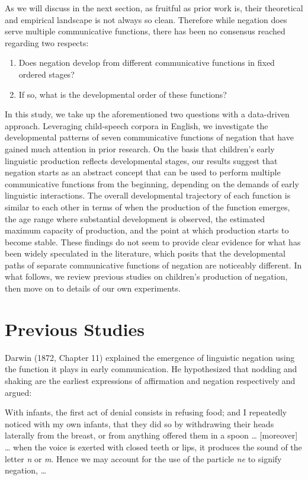 \documentclass[
  english,
  man,floatsintext]{apa6}
\begin{document}
As we will discuss in the next section, as fruitful as prior work is, their theoretical and empirical landscape is not always so clean. Therefore while negation does serve multiple communicative functions, there has been no consensus reached regarding two respects:

\begin{enumerate}
\def\labelenumi{(\arabic{enumi})}
\item
  Does negation develop from different communicative functions in fixed ordered stages?
\item
  If so, what is the developmental order of these functions?
\end{enumerate}

In this study, we take up the aforementioned two questions with a data-driven approach. Leveraging child-speech corpora in English, we investigate the developmental patterns of seven communicative functions of negation that have gained much attention in prior research. On the basis that children's early linguistic production reflects developmental stages, our results suggest that negation starts as an abstract concept that can be used to perform multiple communicative functions from the beginning, depending on the demands of early linguistic interactions. The overall developmental trajectory of each function is similar to each other in terms of when the production of the function emerges, the age range where substantial development is observed, the estimated maximum capacity of production, and the point at which production starts to become stable. These findings do not seem to provide clear evidence for what has been widely speculated in the literature, which posits that the developmental paths of separate communicative functions of negation are noticeably different. In what follows, we review previous studies on children's production of negation, then move on to details of our own experiments.

\hypertarget{previous-studies}{%
\section{Previous Studies}\label{previous-studies}}

Darwin (1872, Chapter 11) explained the emergence of linguistic negation using the function it plays in early communication. He hypothesized that nodding and shaking are the earliest expressions of affirmation and negation respectively and argued:

With infants, the first act of denial consists in refusing food; and I repeatedly noticed with my own infants, that they did so by withdrawing their heads laterally from the breast, or from anything offered them in a spoon \ldots{} {[}moreover{]} \ldots{} when the voice is exerted with closed teeth or lips, it produces the sound of the letter \emph{n} or \emph{m}. Hence we may account for the use of the particle \emph{ne} to signify negation, \ldots{}
\end{document}
